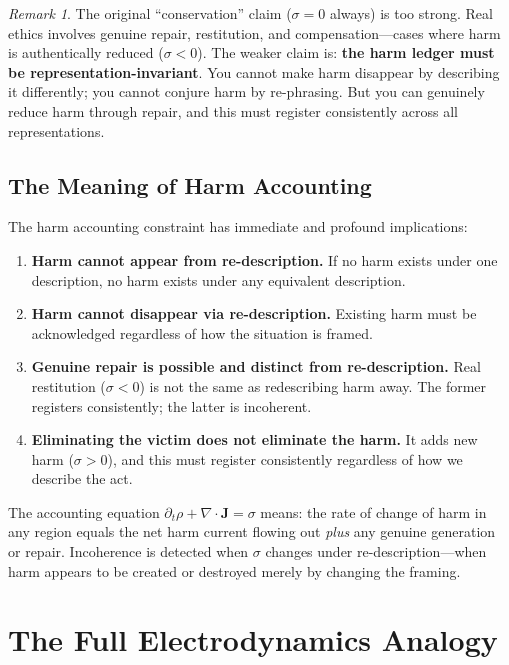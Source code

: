 \documentclass[12pt,letterpaper]{article}
\theoremstyle{definition}
\theoremstyle{remark}
\newtheorem{remark}[theorem]{Remark}
\begin{document}
\begin{remark}
The original ``conservation'' claim ($\sigma = 0$ always) is too strong. Real ethics involves genuine repair, restitution, and compensation---cases where harm is authentically reduced ($\sigma < 0$). The weaker claim is: \textbf{the harm ledger must be representation-invariant}. You cannot make harm disappear by describing it differently; you cannot conjure harm by re-phrasing. But you can genuinely reduce harm through repair, and this must register consistently across all representations.
\end{remark}

\subsection{The Meaning of Harm Accounting}

The harm accounting constraint has immediate and profound implications:

\begin{enumerate}
    \item \textbf{Harm cannot appear from re-description.} If no harm exists under one description, no harm exists under any equivalent description.
    \item \textbf{Harm cannot disappear via re-description.} Existing harm must be acknowledged regardless of how the situation is framed.
    \item \textbf{Genuine repair is possible and distinct from re-description.} Real restitution ($\sigma < 0$) is not the same as redescribing harm away. The former registers consistently; the latter is incoherent.
    \item \textbf{Eliminating the victim does not eliminate the harm.} It adds new harm ($\sigma > 0$), and this must register consistently regardless of how we describe the act.
\end{enumerate}

The accounting equation $\partial_t \rho + \nabla \cdot \mathbf{J} = \sigma$ means: the rate of change of harm in any region equals the net harm current flowing out \textit{plus} any genuine generation or repair. Incoherence is detected when $\sigma$ changes under re-description---when harm appears to be created or destroyed merely by changing the framing.

\section{The Full Electrodynamics Analogy}
\end{document}

